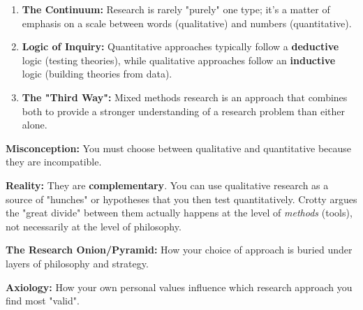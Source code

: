 \documentclass{report}
\begin{document}
\begin{layerTakeaways}
    \begin{enumerate}
        \item \textbf{The Continuum:} Research is rarely "purely" one type; it's a matter of emphasis on a scale between words (qualitative) and numbers (quantitative).
        \item \textbf{Logic of Inquiry:} Quantitative approaches typically follow a \textbf{deductive} logic (testing theories), while qualitative approaches follow an \textbf{inductive} logic (building theories from data).
        \item \textbf{The "Third Way":} Mixed methods research is an approach that combines both to provide a stronger understanding of a research problem than either alone.
    \end{enumerate}
\end{layerTakeaways}

\begin{misconception}
    \textbf{Misconception:} You must choose between qualitative and quantitative because they are incompatible.
    
    
    \textbf{Reality:} They are \textbf{complementary}. You can use qualitative research as a source of "hunches" or hypotheses that you then test quantitatively. Crotty argues the "great divide" between them actually happens at the level of \textit{methods} (tools), not necessarily at the level of philosophy.
\end{misconception}

\begin{optionalExplore}
    \textbf{The Research Onion/Pyramid:} How your choice of approach is buried under layers of philosophy and strategy.
    
    
    \textbf{Axiology:} How your own personal values influence which research approach you find most "valid".
\end{optionalExplore}
\end{document}
